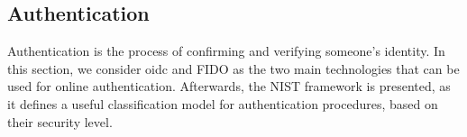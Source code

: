 \subsection{Authentication} \label{authentication_sota}
Authentication is the process of confirming and verifying someone's identity. In this section, we consider \acrlong{oidc} and FIDO as the two main technologies that can be used for online authentication. Afterwards, the NIST framework is presented, as it defines a useful classification model for authentication procedures, based on their security level.



